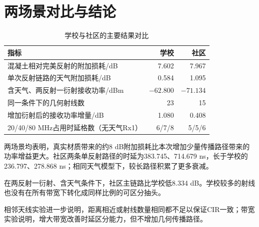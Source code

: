 \documentclass[UTF8,a4paper,zihao=5]{ctexart}
\begin{document}
\section{两场景对比与结论}
\begin{table}[H]\centering\small
\caption{学校与社区的主要结果对比}
\begin{tabular}{lrr}\toprule
指标 & 学校 & 社区\\\midrule
混凝土相对完美反射的附加损耗/dB & 7.602 & 7.967\\
单次反射链路的天气附加损耗/dB & 0.584 & 1.095\\
含天气、两反射一衍射接收功率/dBm & $-62.800$ & $-71.134$\\
同一条件下的几何射线数 & 23 & 15\\
增加衍射后的接收功率增量/dB & 1.080 & 0.408\\
20/40/80 MHz占用时延格数（无天气Rx1） & 6/7/8 & 5/5/6\\\bottomrule
\end{tabular}
\end{table}
两场景均表明，真实材质带来的约8 dB附加损耗比本次增加少量传播路径带来的功率增益更大。社区两条单反射路径的时延为383.745、714.679 ns，长于学校的236.797、278.868 ns；相同天气模型下，较长路径积累了更多衰减。

在两反射一衍射、含天气条件下，社区主链路比学校低8.334 dB。学校较多的射线也没有在所有带宽下转化成同样比例的可区分抽头。

相邻天线实验进一步说明，距离相近或射线数量相同都不足以保证CIR一致；带宽实验说明，增大带宽改善时延区分能力，但不增加几何传播路径。
\end{document}
